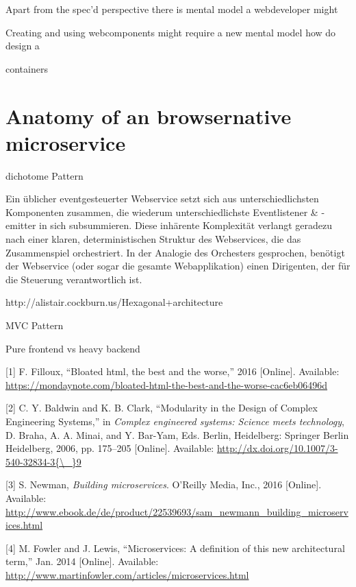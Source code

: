 \documentclass[]{assets/latex/ieee}
\begin{document}
Apart from the spec'd perspective there is mental model a webdeveloper
might

Creating and using webcomponents might require a new mental model how do
design a

containers

\section{Anatomy of an browsernative
microservice}\label{anatomy-of-an-browsernative-microservice}

dichotome Pattern

Ein üblicher eventgesteuerter Webservice setzt sich aus
unterschiedlichsten Komponenten zusammen, die wiederum
unterschiedlichste Eventlistener \& -emitter in sich subsummieren. Diese
inhärente Komplexität verlangt geradezu nach einer klaren,
deterministischen Struktur des Webservices, die das Zusammenspiel
orchestriert. In der Analogie des Orchesters gesprochen, benötigt der
Webservice (oder sogar die gesamte Webapplikation) einen Dirigenten, der
für die Steuerung verantwortlich ist.

http://alistair.cockburn.us/Hexagonal+architecture

MVC Pattern

Pure frontend vs heavy backend

\hypertarget{refs}{}
\hypertarget{ref-Filloux2016}{}
{[}1{]} F. Filloux, ``Bloated html, the best and the worse,'' 2016
{[}Online{]}. Available:
\url{https://mondaynote.com/bloated-html-the-best-and-the-worse-cac6eb06496d}

\hypertarget{ref-Baldwin2006}{}
{[}2{]} C. Y. Baldwin and K. B. Clark, ``Modularity in the Design of
Complex Engineering Systems,'' in \emph{Complex engineered systems:
Science meets technology}, D. Braha, A. A. Minai, and Y. Bar-Yam, Eds.
Berlin, Heidelberg: Springer Berlin Heidelberg, 2006, pp. 175--205
{[}Online{]}. Available:
\href{http://dx.doi.org/10.1007/3-540-32834-3\%7B/_\%7D9}{http://dx.doi.org/10.1007/3-540-32834-3\{\textbackslash{}\_\}9}

\hypertarget{ref-Newman2015}{}
{[}3{]} S. Newman, \emph{Building microservices}. O'Reilly Media, Inc.,
2016 {[}Online{]}. Available:
\url{http://www.ebook.de/de/product/22539693/sam_newmann_building_microservices.html}

\hypertarget{ref-Fowler2014}{}
{[}4{]} M. Fowler and J. Lewis, ``Microservices: A definition of this
new architectural term,'' Jan. 2014 {[}Online{]}. Available:
\url{http://www.martinfowler.com/articles/microservices.html}
\end{document}
